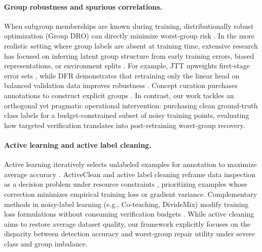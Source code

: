 \documentclass{article}
\begin{document}
\paragraph{Group robustness and spurious correlations.}
When subgroup memberships are known during training, distributionally robust optimization (Group DRO) can directly minimize worst-group risk \citep{sagawa2019distributionally}. In the more realistic setting where group labels are absent at training time, extensive research has focused on inferring latent group structure from early training errors, biased representations, or environment splits \citep{liu2021just,nam2020learning,sohoni2020nosubclass,creager2021environment,zhang2022correct,kirichenko2023last}. For example, JTT upweights first-stage error sets \citep{liu2021just}, while DFR demonstrates that retraining only the linear head on balanced validation data improves robustness \citep{kirichenko2023last}. Concept curation purchases annotations to construct explicit groups \citep{yang2024concept}. In contrast, our work tackles an orthogonal yet pragmatic operational intervention: purchasing clean ground-truth class labels for a budget-constrained subset of noisy training points, evaluating how targeted verification translates into post-retraining worst-group recovery.

\paragraph{Active learning and active label cleaning.}
Active learning iteratively selects unlabeled examples for annotation to maximize average accuracy \citep{sener2018coreset}. ActiveClean and active label cleaning reframe data inspection as a decision problem under resource constraints \citep{krishnan2016activeclean,bernhardt2022active}, prioritizing examples whose correction minimizes empirical training loss or gradient variance. Complementary methods in noisy-label learning (e.g., Co-teaching, DivideMix) modify training loss formulations without consuming verification budgets \citep{song2023noisylabels}. While active cleaning aims to restore average dataset quality, our framework explicitly focuses on the disparity between detection accuracy and worst-group repair utility under severe class and group imbalance.
\end{document}
